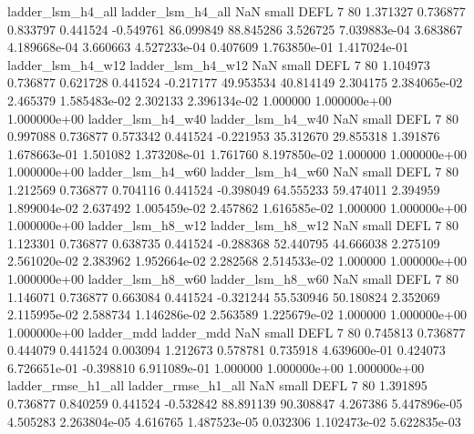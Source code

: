        ladder_lsm_h4_all        ladder_lsm_h4_all                   NaN      small     DEFL                 7 80 1.371327       0.736877 0.833797       0.441524   -0.549761     86.099849     88.845286     3.526725   7.039883e-04  3.683867 4.189668e-04     3.660663   4.527233e-04            0.407609    1.763850e-01        1.417024e-01
       ladder_lsm_h4_w12        ladder_lsm_h4_w12                   NaN      small     DEFL                 7 80 1.104973       0.736877 0.621728       0.441524   -0.217177     49.953534     40.814149     2.304175   2.384065e-02  2.465379 1.585483e-02     2.302133   2.396134e-02            1.000000    1.000000e+00        1.000000e+00
       ladder_lsm_h4_w40        ladder_lsm_h4_w40                   NaN      small     DEFL                 7 80 0.997088       0.736877 0.573342       0.441524   -0.221953     35.312670     29.855318     1.391876   1.678663e-01  1.501082 1.373208e-01     1.761760   8.197850e-02            1.000000    1.000000e+00        1.000000e+00
       ladder_lsm_h4_w60        ladder_lsm_h4_w60                   NaN      small     DEFL                 7 80 1.212569       0.736877 0.704116       0.441524   -0.398049     64.555233     59.474011     2.394959   1.899004e-02  2.637492 1.005459e-02     2.457862   1.616585e-02            1.000000    1.000000e+00        1.000000e+00
       ladder_lsm_h8_w12        ladder_lsm_h8_w12                   NaN      small     DEFL                 7 80 1.123301       0.736877 0.638735       0.441524   -0.288368     52.440795     44.666038     2.275109   2.561020e-02  2.383962 1.952664e-02     2.282568   2.514533e-02            1.000000    1.000000e+00        1.000000e+00
       ladder_lsm_h8_w60        ladder_lsm_h8_w60                   NaN      small     DEFL                 7 80 1.146071       0.736877 0.663084       0.441524   -0.321244     55.530946     50.180824     2.352069   2.115995e-02  2.588734 1.146286e-02     2.563589   1.225679e-02            1.000000    1.000000e+00        1.000000e+00
              ladder_mdd               ladder_mdd                   NaN      small     DEFL                 7 80 0.745813       0.736877 0.444079       0.441524    0.003094      1.212673      0.578781     0.735918   4.639600e-01  0.424073 6.726651e-01    -0.398810   6.911089e-01            1.000000    1.000000e+00        1.000000e+00
      ladder_rmse_h1_all       ladder_rmse_h1_all                   NaN      small     DEFL                 7 80 1.391895       0.736877 0.840259       0.441524   -0.532842     88.891139     90.308847     4.267386   5.447896e-05  4.505283 2.263804e-05     4.616765   1.487523e-05            0.032306    1.102473e-02        5.622835e-03

